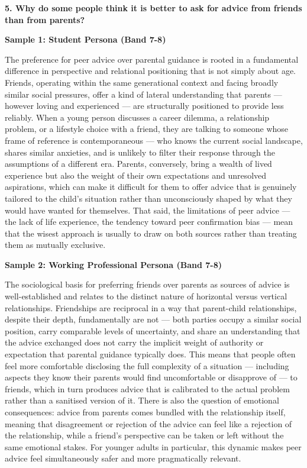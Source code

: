 \separator

\begin{ieltsquestion}
\textbf{5. Why do some people think it is better to ask for advice from friends than from parents?}
\end{ieltsquestion}
\textbf{Sample 1: Student Persona (Band 7-8)}

The preference for peer advice over parental guidance is rooted in a fundamental difference in perspective and relational positioning that is not simply about age. Friends, operating within the same generational context and facing broadly similar social pressures, offer a kind of lateral understanding that parents — however loving and experienced — are structurally positioned to provide less reliably. When a young person discusses a career dilemma, a relationship problem, or a lifestyle choice with a friend, they are talking to someone whose frame of reference is contemporaneous — who knows the current social landscape, shares similar anxieties, and is unlikely to filter their response through the assumptions of a different era. Parents, conversely, bring a wealth of lived experience but also the weight of their own expectations and unresolved aspirations, which can make it difficult for them to offer advice that is genuinely tailored to the child's situation rather than unconsciously shaped by what they would have wanted for themselves. That said, the limitations of peer advice — the lack of life experience, the tendency toward peer confirmation bias — mean that the wisest approach is usually to draw on both sources rather than treating them as mutually exclusive.

\textbf{Sample 2: Working Professional Persona (Band 7-8)}

The sociological basis for preferring friends over parents as sources of advice is well-established and relates to the distinct nature of horizontal versus vertical relationships. Friendships are reciprocal in a way that parent-child relationships, despite their depth, fundamentally are not — both parties occupy a similar social position, carry comparable levels of uncertainty, and share an understanding that the advice exchanged does not carry the implicit weight of authority or expectation that parental guidance typically does. This means that people often feel more comfortable disclosing the full complexity of a situation — including aspects they know their parents would find uncomfortable or disapprove of — to friends, which in turn produces advice that is calibrated to the actual problem rather than a sanitised version of it. There is also the question of emotional consequences: advice from parents comes bundled with the relationship itself, meaning that disagreement or rejection of the advice can feel like a rejection of the relationship, while a friend's perspective can be taken or left without the same emotional stakes. For younger adults in particular, this dynamic makes peer advice feel simultaneously safer and more pragmatically relevant.

